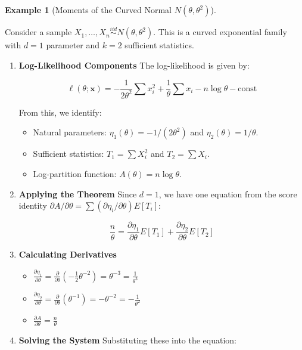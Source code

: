 \documentclass[
  letterpaper,
  DIV=11,
  numbers=noendperiod]{scrreprt}
\providecommand{\tightlist}{%
  \setlength{\itemsep}{0pt}\setlength{\parskip}{0pt}}
\renewcommand{\[}{\begin{equation}}
\renewcommand{\]}{\end{equation}}
\theoremstyle{definition}
\theoremstyle{plain}
\theoremstyle{plain}
\theoremstyle{plain}
\theoremstyle{definition}
\newtheorem{example}{Example}[chapter]
\theoremstyle{plain}
\theoremstyle{remark}
\begin{document}
\begin{example}[Moments of the Curved Normal
\(N(\theta, \theta^2)\)]\protect\hypertarget{exm-curved-normal-moments}{}\label{exm-curved-normal-moments}

Consider a sample
\(X_1, \dots, X_n \overset{iid}{\sim} N(\theta, \theta^2)\). This is a
curved exponential family with \(d=1\) parameter and \(k=2\) sufficient
statistics.

\begin{enumerate}
\def\labelenumi{\arabic{enumi}.}
\item
  \textbf{Log-Likelihood Components} The log-likelihood is given by:

  \[
  \ell(\theta; \mathbf{x}) = -\frac{1}{2\theta^2} \sum x_i^2 + \frac{1}{\theta} \sum x_i - n \log \theta - \text{const}
  \]

  From this, we identify:

  \begin{itemize}
  \tightlist
  \item
    Natural parameters: \(\eta_1(\theta) = -1/(2\theta^2)\) and
    \(\eta_2(\theta) = 1/\theta\).
  \item
    Sufficient statistics: \(T_1 = \sum X_i^2\) and \(T_2 = \sum X_i\).
  \item
    Log-partition function: \(A(\theta) = n \log \theta\).
  \end{itemize}
\item
  \textbf{Applying the Theorem} Since \(d=1\), we have one equation from
  the score identity
  \(\partial A / \partial \theta = \sum (\partial \eta_i / \partial \theta) E[T_i]\):

  \[
  \frac{n}{\theta} = \frac{\partial \eta_1}{\partial \theta} E[T_1] + \frac{\partial \eta_2}{\partial \theta} E[T_2]
  \]
\item
  \textbf{Calculating Derivatives}

  \begin{itemize}
  \tightlist
  \item
    \(\frac{\partial \eta_1}{\partial \theta} = \frac{\partial}{\partial \theta} (-\frac{1}{2}\theta^{-2}) = \theta^{-3} = \frac{1}{\theta^3}\)
  \item
    \(\frac{\partial \eta_2}{\partial \theta} = \frac{\partial}{\partial \theta} (\theta^{-1}) = -\theta^{-2} = -\frac{1}{\theta^2}\)
  \item
    \(\frac{\partial A}{\partial \theta} = \frac{n}{\theta}\)
  \end{itemize}
\item
  \textbf{Solving the System} Substituting these into the equation:


\end{enumerate}
\end{example}
\end{document}
